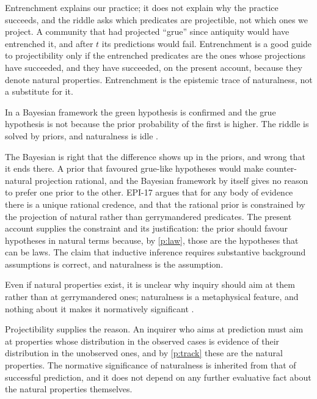 \documentclass{situationist-preprint}
\begin{document}
\begin{reply}
Entrenchment explains our practice; it does not explain why the practice succeeds, and the riddle asks which predicates are projectible, not which ones we project. A community that had projected \enquote{grue} since antiquity would have entrenched it, and after $t$ its predictions would fail. Entrenchment is a good guide to projectibility only if the entrenched predicates are the ones whose projections have succeeded, and they have succeeded, on the present account, because they denote natural properties. Entrenchment is the epistemic trace of naturalness, not a substitute for it.
\end{reply}

\begin{objection}
In a Bayesian framework the green hypothesis is confirmed and the grue hypothesis is not because the prior probability of the first is higher. The riddle is solved by priors, and naturalness is idle \citep{Sober1994}.
\end{objection}

\begin{reply}
The Bayesian is right that the difference shows up in the priors, and wrong that it ends there. A prior that favoured grue-like hypotheses would make counter-natural projection rational, and the Bayesian framework by itself gives no reason to prefer one prior to the other. EPI-17 argues that for any body of evidence there is a unique rational credence, and that the rational prior is constrained by the projection of natural rather than gerrymandered predicates. The present account supplies the constraint and its justification: the prior should favour hypotheses in natural terms because, by \ref{p:law}, those are the hypotheses that can be laws. The claim that inductive inference requires substantive background assumptions \citep{Okasha2007} is correct, and naturalness is the assumption.
\end{reply}

\begin{objection}
Even if natural properties exist, it is unclear why inquiry should aim at them rather than at gerrymandered ones; naturalness is a metaphysical feature, and nothing about it makes it normatively significant \citep{Dasgupta2018}.
\end{objection}

\begin{reply}
Projectibility supplies the reason. An inquirer who aims at prediction must aim at properties whose distribution in the observed cases is evidence of their distribution in the unobserved ones, and by \ref{p:track} these are the natural properties. The normative significance of naturalness is inherited from that of successful prediction, and it does not depend on any further evaluative fact about the natural properties themselves.
\end{reply}
\end{document}
